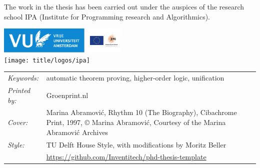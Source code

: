 \begin{titlepage}


\newpage
\noindent The work in the thesis has been carried out under the auspices of the research school IPA
(Institute for Programming research and Algorithmics).

\medskip
\vfill
\begin{center}
    \includegraphics[height=0.5in]{title/logos/vulogo}
    \hspace{2em}
    \includegraphics[height=0.5in]{title/logos/erclogo}
    \\ \vspace{0.5cm}
    \texttt{[image: title/logos/ipa]}
\end{center}
\vfill

\noindent
\begin{tabular}{@{}p{}@{}p{}}
  \textit{Keywords:} & automatic theorem proving, higher-order logic, unification  \\[\medskipamount]
      \textit{Printed by:} & Groenprint.nl \\[\medskipamount]
      \textit{Cover:} &  Marina Abramović, Rhythm 10 (The Biography), Cibachrome Print,
                         1997, © Marina Abramović,
                         Courtesy of the Marina Abramović Archives \\[\medskipamount]
      \textit{Style:} & TU Delft House Style, with modifications by Moritz Beller \\& \url{https://github.com/Inventitech/phd-thesis-template} \\[\medskipamount]
\end{tabular}


\end{titlepage}
